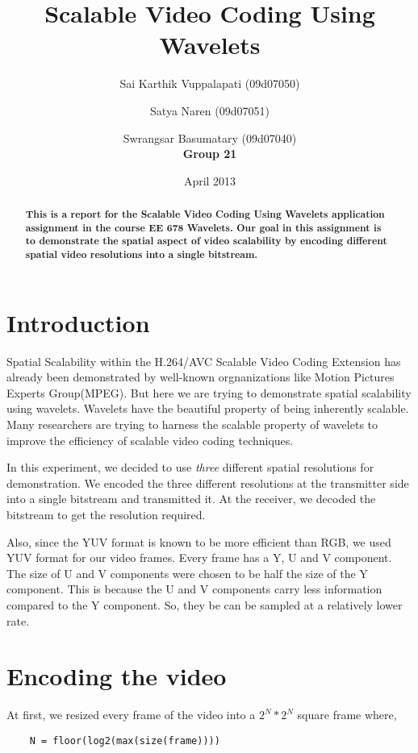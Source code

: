 \documentclass[10pt,twocolumn]{article}
\title{Scalable Video Coding Using Wavelets}
\author{Sai Karthik Vuppalapati (09d07050) \\
\and Satya Naren (09d07051) \\
\and Swrangsar Basumatary (09d07040) \\
\textbf{Group 21}}
\date{April 2013}
\begin{document}
\maketitle

\begin{abstract}
    \textbf{This is a report for the Scalable Video Coding Using Wavelets application assignment in the course EE 678 Wavelets. Our goal in this assignment is to demonstrate the spatial aspect of video scalability by encoding different spatial video resolutions into a single bitstream.}
\end{abstract}

\section{Introduction}

Spatial Scalability within the H.264/AVC Scalable Video Coding Extension has already been demonstrated\cite{segall2007} by well-known orgnanizations like Motion Pictures Experts Group(MPEG). But here we are trying to demonstrate spatial scalability using wavelets. Wavelets have the beautiful property of being inherently scalable. Many researchers are trying to harness the scalable property of wavelets to improve the efficiency of scalable video coding techniques.

In this experiment, we decided to use \emph{three} different spatial resolutions for demonstration. We encoded the three different resolutions at the transmitter side into a single bitstream and transmitted it. At the receiver, we decoded the bitstream to get the resolution required.

Also, since the YUV format is known to be more efficient than RGB, we used YUV format for our video frames. Every frame has a Y, U and V component. The size of U and V components were chosen to be half the size of the Y component. This is because the U and V components carry less information compared to the Y component. So, they be can be sampled at a relatively lower rate.

\section{Encoding the video}

At first, we resized every frame of the video into a $2^N * 2^N$ square frame where,
\begin{verbatim}
    N = floor(log2(max(size(frame))))
\end{verbatim}
\end{document}
